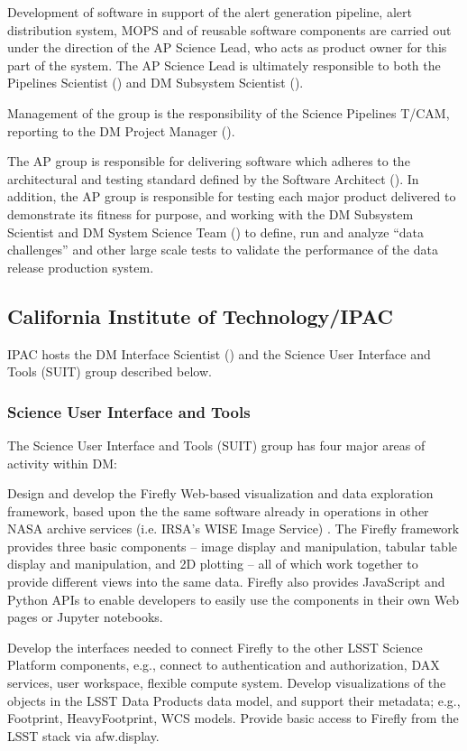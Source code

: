 Development of software in support of the alert generation pipeline, alert distribution system, MOPS and of reusable software components are carried out under the direction of the AP Science Lead, who acts as product owner for this part of the system.
The AP Science Lead is ultimately responsible to both the Pipelines Scientist () and DM Subsystem Scientist ().

Management of the group is the responsibility of the Science Pipelines T/CAM, reporting to the DM Project Manager ().

The AP group is responsible for delivering software which adheres to the architectural and testing standard defined by the Software Architect ().
In addition, the AP group is responsible for testing each major product delivered to demonstrate its fitness for purpose, and working with the DM Subsystem Scientist and DM System Science Team () to define, run and analyze ``data challenges'' and other large scale tests to validate the performance of the data release production system.

\subsection {California Institute of Technology/IPAC\label{sect:ipac}}
IPAC hosts the DM Interface Scientist () and the Science User Interface and Tools (SUIT) group described below.

\subsubsection{ Science User Interface and Tools}

The Science User Interface and Tools (SUIT) group has four major areas of activity within DM:

Design and develop the Firefly Web-based visualization and data exploration framework, based upon the the same software already in operations in other NASA archive services (i.e. IRSA’s WISE Image Service) . The Firefly framework provides three basic components –  image display and manipulation, tabular table display and manipulation, and 2D plotting – all of which work together to provide different views into the same data. Firefly also provides JavaScript and Python APIs to enable developers to easily use the components in their own Web pages or Jupyter notebooks.

Develop the interfaces needed to connect Firefly to the other LSST Science Platform components, e.g., connect to authentication and authorization, DAX services, user workspace, flexible compute system.  Develop visualizations of the objects in the LSST Data Products data model, and support their metadata; e.g., Footprint, HeavyFootprint, WCS models.  Provide basic access to Firefly from the LSST stack via afw.display.

